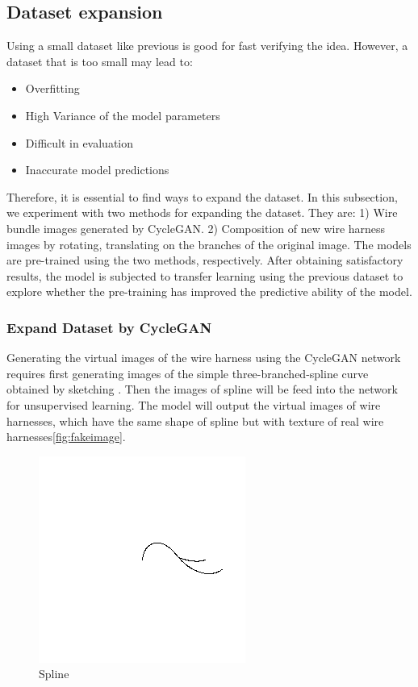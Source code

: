 \subsection{Dataset expansion}
Using a small dataset like previous is good for fast verifying the idea. However, a dataset that is too small may lead to: 
\begin{itemize}
	\item Overfitting
	\item High Variance of the model parameters
	\item Difficult in evaluation
	\item Inaccurate model predictions
\end{itemize}
Therefore, it is essential to find ways to expand the dataset. In this subsection, we experiment with two methods for expanding the dataset. They are:
1) Wire bundle images generated by CycleGAN. 2) Composition of new wire harness images by rotating, translating on the branches of the original image. 
The models are pre-trained using the two methods, respectively. After obtaining satisfactory results, the model is subjected to transfer learning using 
the previous dataset to explore whether the pre-training has improved the predictive ability of the model.
\subsubsection{Expand Dataset by CycleGAN}
Generating the virtual images of the wire harness using the CycleGAN network requires first generating images of the simple three-branched-spline curve 
obtained by sketching . Then the images of spline will be feed into the network for unsupervised learning. The model will output the virtual images of 
wire harnesses, which have the same shape of spline but with texture of real wire harnesses\autoref{fig:fakeimage}.
\begin{figure}
	\centering
	\includegraphics[width=0.6\linewidth]{example_images/CycleGAN_spline}
	\caption{Spline}
	\label{fig:Spline}
\end{figure}

